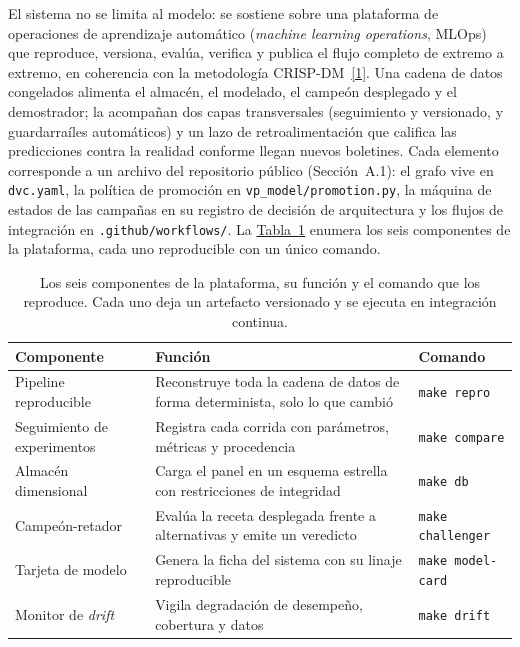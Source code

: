 \documentclass[12pt,letterpaper]{report}
\newcommand{\cita}[1]{\hyperref[bib:#1]{[#1]}}
\begin{document}
El sistema no se limita al modelo: se sostiene sobre una plataforma de operaciones de
aprendizaje autom\'atico (\textit{machine learning operations}, MLOps) que reproduce,
versiona, eval\'ua, verifica y publica el flujo completo de extremo a extremo, en
coherencia con la metodolog\'ia CRISP-DM~\cita{1}. Una cadena de datos congelados alimenta el
almacén, el modelado, el campeón desplegado y el demostrador; la acompañan dos capas
transversales (seguimiento y versionado, y guardarraíles automáticos) y un lazo de
retroalimentación que califica las predicciones contra la realidad conforme llegan nuevos
boletines. Cada elemento corresponde a un archivo del repositorio público (Sección~A.1): el grafo
vive en \texttt{dvc.yaml}, la política de promoción en \texttt{vp\_model/promotion.py}, la
máquina de estados de las campañas en su registro de decisión de arquitectura y los flujos de
integración en \texttt{.github/workflows/}. La \hyperref[tab:mlops_pilares]{Tabla~\ref*{tab:mlops_pilares}} enumera los seis
componentes de la plataforma, cada uno reproducible con un \'unico comando.

\begin{table}[htbp]
\centering
\footnotesize
\caption[Componentes de la plataforma MLOps]{Los seis componentes de la plataforma, su
funci\'on y el comando que los reproduce. Cada uno deja un artefacto versionado y se ejecuta
en integraci\'on continua.}
\label{tab:mlops_pilares}
\begin{tabular}{@{}p{3.0cm} p{7.6cm} p{2.9cm}@{}}
\toprule
\rowcolor{uacjblue!15}
\textbf{Componente} & \textbf{Funci\'on} & \textbf{Comando} \\ \midrule
Pipeline reproducible & Reconstruye toda la cadena de datos de forma determinista, solo lo que cambi\'o & \texttt{make repro} \\
Seguimiento de experimentos & Registra cada corrida con par\'ametros, m\'etricas y procedencia & \texttt{make compare} \\
Almac\'en dimensional & Carga el panel en un esquema estrella con restricciones de integridad & \texttt{make db} \\
Campe\'on-retador & Eval\'ua la receta desplegada frente a alternativas y emite un veredicto & \texttt{make challenger} \\
Tarjeta de modelo & Genera la ficha del sistema con su linaje reproducible & \texttt{make model-card} \\
Monitor de \textit{drift} & Vigila degradaci\'on de desempe\~no, cobertura y datos & \texttt{make drift} \\
\bottomrule
\end{tabular}
\end{table}
\end{document}
